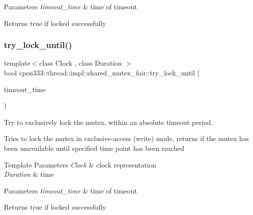 \begin{DoxyParams}{Parameters}
{\em timeout\+\_\+time} & time of timeout \\
\hline
\end{DoxyParams}
\begin{DoxyReturn}{Returns}
true if locked successfully 
\end{DoxyReturn}
\mbox{\label{classcpen333_1_1thread_1_1impl_1_1shared__mutex__fair_a4780ae180ff8f0d4a69d56f4f1095b78}} 
\subsubsection{\texorpdfstring{try\+\_\+lock\+\_\+until()}{try\_lock\_until()}}
{\footnotesize\ttfamily template$<$class Clock , class Duration $>$ \\
bool cpen333\+::thread\+::impl\+::shared\+\_\+mutex\+\_\+fair\+::try\+\_\+lock\+\_\+until (\begin{DoxyParamCaption}\item[{const std\+::chrono\+::time\+\_\+point$<$ Clock, Duration $>$ \&}]{timeout\+\_\+time }\end{DoxyParamCaption})\hspace{0.3cm}{\ttfamily [inline]}}



Try to exclusively lock the mutex, within an absolute timeout period. 

Tries to lock the mutex in exclusive-\/access (write) mode, returns if the mutex has been unavailable until specified time point has been reached


\begin{DoxyTemplParams}{Template Parameters}
{\em Clock} & clock representation \\
\hline
{\em Duration} & time \\
\hline
\end{DoxyTemplParams}

\begin{DoxyParams}{Parameters}
{\em timeout\+\_\+time} & time of timeout \\
\hline
\end{DoxyParams}
\begin{DoxyReturn}{Returns}
true if locked successfully 
\end{DoxyReturn}
\mbox{\label{classcpen333_1_1thread_1_1impl_1_1shared__mutex__fair_a5c8440694cb8d3fe3d798dbcc6659495}} 

